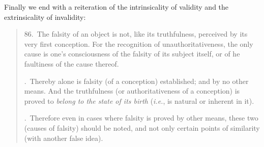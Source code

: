 ﻿\documentclass[11pt]{amsart}
\begin{document}
Finally we end with a reiteration of the intrinsicality of validity and the extrinsicality of invalidity:\small\begin{quote}86.~The falsity of an object is not, like its truthfulness, perceived by its very first conception. For the recognition of unauthoritativeness, the only cause is one's consciousness of the falsity of its subject itself, or of he faultiness of the cause thereof.

.~Thereby alone is falsity (of a conception) established; and by no other means. And the truthfulness (or authoritativeness of a conception) is proved to \emph{belong to the state of its birth} (\emph{i.e.}, is natural or inherent in it).

.~Therefore even in cases where falsity is proved by other means, these two (causes of falsity) should be noted, and not only certain points of similarity (with another false idea).\end{quote}\normalsize 














\end{document}

